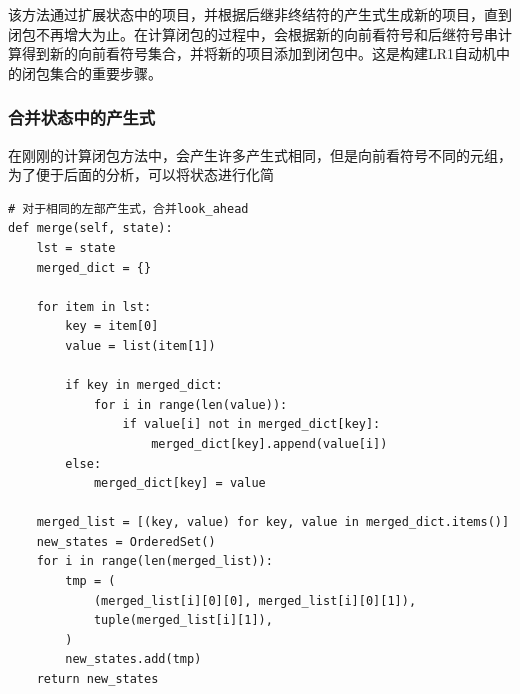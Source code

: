\documentclass[lang=cn,11pt,a4paper]{elegantpaper}
\begin{document}
该方法通过扩展状态中的项目，并根据后继非终结符的产生式生成新的项目，直到闭包不再增大为止。在计算闭包的过程中，会根据新的向前看符号和后继符号串计算得到新的向前看符号集合，并将新的项目添加到闭包中。这是构建LR1自动机中的闭包集合的重要步骤。

\subsubsection{合并状态中的产生式}

在刚刚的计算闭包方法中，会产生许多产生式相同，但是向前看符号不同的元组，为了便于后面的分析，可以将状态进行化简

\begin{lstlisting}
# 对于相同的左部产生式，合并look_ahead
def merge(self, state):
    lst = state
    merged_dict = {}

    for item in lst:
        key = item[0]
        value = list(item[1])

        if key in merged_dict:
            for i in range(len(value)):
                if value[i] not in merged_dict[key]:
                    merged_dict[key].append(value[i])
        else:
            merged_dict[key] = value

    merged_list = [(key, value) for key, value in merged_dict.items()]
    new_states = OrderedSet()
    for i in range(len(merged_list)):
        tmp = (
            (merged_list[i][0][0], merged_list[i][0][1]),
            tuple(merged_list[i][1]),
        )
        new_states.add(tmp)
    return new_states
\end{lstlisting}
\end{document}
